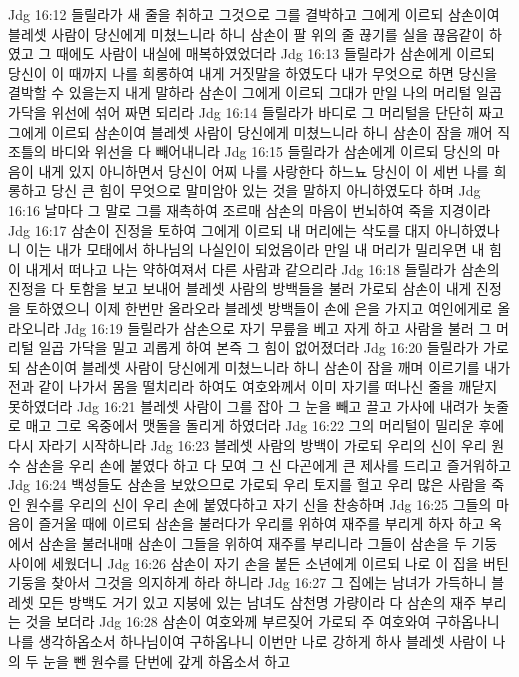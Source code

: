 Jdg 16:12  들릴라가 새 줄을 취하고 그것으로 그를 결박하고 그에게 이르되 삼손이여 블레셋 사람이 당신에게 미쳤느니라 하니 삼손이 팔 위의 줄 끊기를 실을 끊음같이 하였고 그 때에도 사람이 내실에 매복하였었더라
Jdg 16:13  들릴라가 삼손에게 이르되 당신이 이 때까지 나를 희롱하여 내게 거짓말을 하였도다 내가 무엇으로 하면 당신을 결박할 수 있을는지 내게 말하라 삼손이 그에게 이르되 그대가 만일 나의 머리털 일곱 가닥을 위선에 섞어 짜면 되리라
Jdg 16:14  들릴라가 바디로 그 머리털을 단단히 짜고 그에게 이르되 삼손이여 블레셋 사람이 당신에게 미쳤느니라 하니 삼손이 잠을 깨어 직조틀의 바디와 위선을 다 빼어내니라
Jdg 16:15  들릴라가 삼손에게 이르되 당신의 마음이 내게 있지 아니하면서 당신이 어찌 나를 사랑한다 하느뇨 당신이 이 세번 나를 희롱하고 당신 큰 힘이 무엇으로 말미암아 있는 것을 말하지 아니하였도다 하며
Jdg 16:16  날마다 그 말로 그를 재촉하여 조르매 삼손의 마음이 번뇌하여 죽을 지경이라
Jdg 16:17  삼손이 진정을 토하여 그에게 이르되 내 머리에는 삭도를 대지 아니하였나니 이는 내가 모태에서 하나님의 나실인이 되었음이라 만일 내 머리가 밀리우면 내 힘이 내게서 떠나고 나는 약하여져서 다른 사람과 같으리라
Jdg 16:18  들릴라가 삼손의 진정을 다 토함을 보고 보내어 블레셋 사람의 방백들을 불러 가로되 삼손이 내게 진정을 토하였으니 이제 한번만 올라오라 블레셋 방백들이 손에 은을 가지고 여인에게로 올라오니라
Jdg 16:19  들릴라가 삼손으로 자기 무릎을 베고 자게 하고 사람을 불러 그 머리털 일곱 가닥을 밀고 괴롭게 하여 본즉 그 힘이 없어졌더라
Jdg 16:20  들릴라가 가로되 삼손이여 블레셋 사람이 당신에게 미쳤느니라 하니 삼손이 잠을 깨며 이르기를 내가 전과 같이 나가서 몸을 떨치리라 하여도 여호와께서 이미 자기를 떠나신 줄을 깨닫지 못하였더라
Jdg 16:21  블레셋 사람이 그를 잡아 그 눈을 빼고 끌고 가사에 내려가 놋줄로 매고 그로 옥중에서 맷돌을 돌리게 하였더라
Jdg 16:22  그의 머리털이 밀리운 후에 다시 자라기 시작하니라
Jdg 16:23  블레셋 사람의 방백이 가로되 우리의 신이 우리 원수 삼손을 우리 손에 붙였다 하고 다 모여 그 신 다곤에게 큰 제사를 드리고 즐거워하고
Jdg 16:24  백성들도 삼손을 보았으므로 가로되 우리 토지를 헐고 우리 많은 사람을 죽인 원수를 우리의 신이 우리 손에 붙였다하고 자기 신을 찬송하며
Jdg 16:25  그들의 마음이 즐거울 때에 이르되 삼손을 불러다가 우리를 위하여 재주를 부리게 하자 하고 옥에서 삼손을 불러내매 삼손이 그들을 위하여 재주를 부리니라 그들이 삼손을 두 기둥 사이에 세웠더니
Jdg 16:26  삼손이 자기 손을 붙든 소년에게 이르되 나로 이 집을 버틴 기둥을 찾아서 그것을 의지하게 하라 하니라
Jdg 16:27  그 집에는 남녀가 가득하니 블레셋 모든 방백도 거기 있고 지붕에 있는 남녀도 삼천명 가량이라 다 삼손의 재주 부리는 것을 보더라
Jdg 16:28  삼손이 여호와께 부르짖어 가로되 주 여호와여 구하옵나니 나를 생각하옵소서 하나님이여 구하옵나니 이번만 나로 강하게 하사 블레셋 사람이 나의 두 눈을 뺀 원수를 단번에 갚게 하옵소서 하고

